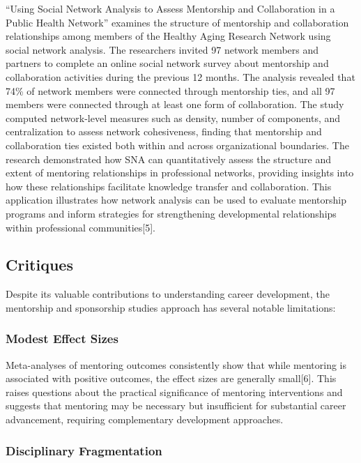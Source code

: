 \documentclass[
  letterpaper,
  DIV=11,
  numbers=noendperiod]{scrartcl}
\begin{document}
``Using Social Network Analysis to Assess Mentorship and Collaboration
in a Public Health Network'' examines the structure of mentorship and
collaboration relationships among members of the Healthy Aging Research
Network using social network analysis. The researchers invited 97
network members and partners to complete an online social network survey
about mentorship and collaboration activities during the previous 12
months. The analysis revealed that 74\% of network members were
connected through mentorship ties, and all 97 members were connected
through at least one form of collaboration. The study computed
network-level measures such as density, number of components, and
centralization to assess network cohesiveness, finding that mentorship
and collaboration ties existed both within and across organizational
boundaries. The research demonstrated how SNA can quantitatively assess
the structure and extent of mentoring relationships in professional
networks, providing insights into how these relationships facilitate
knowledge transfer and collaboration. This application illustrates how
network analysis can be used to evaluate mentorship programs and inform
strategies for strengthening developmental relationships within
professional communities{[}5{]}.

\subsection{Critiques}\label{critiques}

Despite its valuable contributions to understanding career development,
the mentorship and sponsorship studies approach has several notable
limitations:

\subsubsection{Modest Effect Sizes}\label{modest-effect-sizes}

Meta-analyses of mentoring outcomes consistently show that while
mentoring is associated with positive outcomes, the effect sizes are
generally small{[}6{]}. This raises questions about the practical
significance of mentoring interventions and suggests that mentoring may
be necessary but insufficient for substantial career advancement,
requiring complementary development approaches.

\subsubsection{Disciplinary
Fragmentation}\label{disciplinary-fragmentation}
\end{document}

